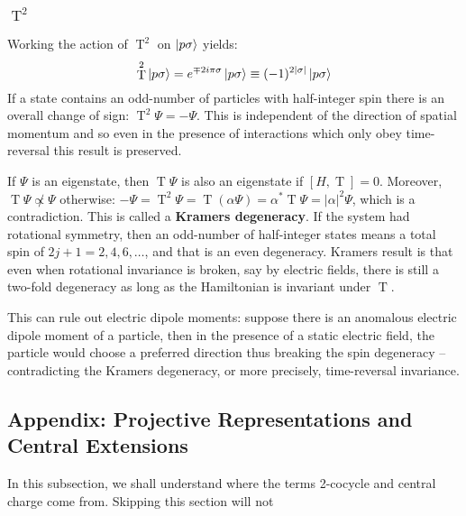 \documentclass[10pt]{article}
\newcommand{\sg}{\sigma}
\theoremstyle{plain}
\theoremstyle{definition}
\theoremstyle{remark}
\DeclareMathOperator{\rT}{T}
\begin{document}
\subsubsection{$\rT^2$} 
Working the action of $\rT^2$ on $\ket{p\sg}$ yields:
\[ \rT^2\ket{p\sg} = e^{\mp 2i\pi\sg}\ket{p\sg} \equiv (-1)^{2|\sg|}\ket{p\sg} \]
If a state contains an odd-number of particles with half-integer spin
there is an overall change of sign: $\rT^2\Psi = -\Psi$. This is
independent of the direction of spatial momentum and so even in the
presence of interactions which only obey time-reversal this result is
preserved.  

If $\Psi$ is an eigenstate, then $\rT\Psi$ is also an eigenstate if
$[H,\rT]=0$. Moreover, $\rT\Psi\not\propto\Psi$ otherwise:
$-\Psi=\rT^2\Psi=\rT(\alpha\Psi) = \alpha^*\rT\Psi =
|\alpha|^2\Psi$, which is a contradiction. This is called a
\textbf{Kramers degeneracy}.
%
If the system had rotational symmetry, then an odd-number of
half-integer states means a total spin of $2j+1=2,4,6,\dots$, and that
is an even degeneracy. Kramers result is that even when rotational
invariance is broken, say by electric fields, there is still a
two-fold degeneracy as long as the Hamiltonian is invariant under
$\rT$.

This can rule out electric dipole moments: suppose there is an
anomalous electric dipole moment of a particle, then in the presence
of a static electric field, the particle would choose a preferred
direction thus breaking the spin degeneracy -- contradicting the
Kramers degeneracy, or more precisely, time-reversal invariance.



\subsection{Appendix: Projective Representations and Central Extensions}
In this subsection, we shall understand where the terms {2-cocycle}
and {central charge} come from. Skipping this section will not 

\begin{center}
\end{center}
\end{document}
